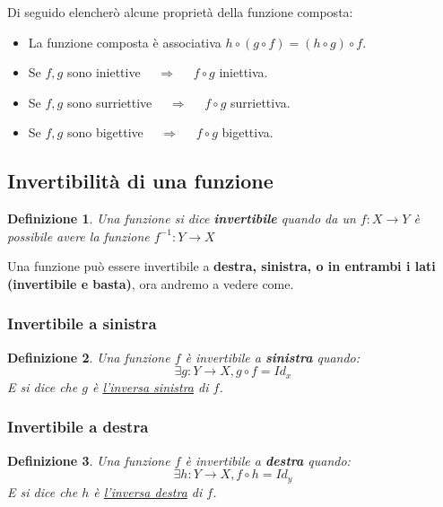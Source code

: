 \documentclass{article}
\newtheorem{definition}{Definizione}[section]
\begin{document}
Di seguido elencherò alcune proprietà della funzione composta:\label{proprietà_funzione_composta}
\begin{itemize}
        \item La funzione composta è associativa $ h \circ (g \circ f) =  (h \circ g ) \circ f$.
        \item Se $ f,g $ sono iniettive $\quad  \Rightarrow \quad $  $ f \circ g $ iniettiva.   
        \item Se $ f,g $ sono surriettive $\quad  \Rightarrow \quad $  $ f \circ g $ surriettiva.   
        \item Se $ f,g $ sono bigettive $\quad  \Rightarrow \quad $  $ f \circ g $ bigettiva.   
\end{itemize}



\subsection{Invertibilità di una funzione}\label{sec:invertibilità}
\begin{definition}
        Una funzione si dice \textbf{invertibile} quando da un $ f : X \to Y $ è possibile avere la funzione $ f^{-1} : Y \to X $   
\end{definition}

Una funzione può essere invertibile a \textbf{destra, sinistra, o in entrambi i lati (invertibile e basta)}, ora andremo a vedere come. 


\subsubsection{Invertibile a sinistra}\label{sec:invertibile_a_sinistra}
\begin{definition}     
        Una funzione $ f $  è invertibile a \textbf{sinistra} quando:
        \begin{equation*}
                \exists g : Y \to X, g \circ f = Id_x 
        \end{equation*}
        E si dice che $ g  $ è \underline{l'inversa sinistra} di $ f $.          
\end{definition}


\subsubsection{Invertibile a destra}\label{sec:invertibile_a_destra}
\begin{definition}     
        Una funzione $ f $ è invertibile a \textbf{destra} quando:
        \begin{equation*}
                \exists h : Y \to X, f \circ h = Id_y 
        \end{equation*}
        E si dice che $ h $ è \underline{l'inversa destra} di $ f $.           
\end{definition}
\end{document}
